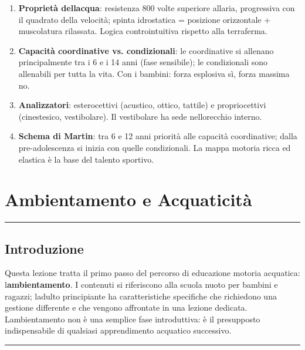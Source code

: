 \documentclass[a4paper,11pt]{article}
\begin{document}
\begin{enumerate}
      \item
            \textbf{Proprietà dell\textquotesingle acqua}: resistenza 800 volte
            superiore all\textquotesingle aria, progressiva con il quadrato della
            velocità; spinta idrostatica = posizione orizzontale + muscolatura
            rilassata. Logica controintuitiva rispetto alla terraferma.
      \item
            \textbf{Capacità coordinative vs. condizionali}: le coordinative si
            allenano principalmente tra i 6 e i 14 anni (fase sensibile); le
            condizionali sono allenabili per tutta la vita. Con i bambini: forza
            esplosiva sì, forza massima no.
      \item
            \textbf{Analizzatori}: esterocettivi (acustico, ottico, tattile) e
            propriocettivi (cinestesico, vestibolare). Il vestibolare ha sede
            nell\textquotesingle orecchio interno.
      \item
            \textbf{Schema di Martin}: tra 6 e 12 anni priorità alle capacità
            coordinative; dalla pre-adolescenza si inizia con quelle condizionali.
            La mappa motoria ricca ed elastica è la base del talento sportivo.
\end{enumerate}

\section{Ambientamento e
  Acquaticità}\label{ambientamento-e-acquaticituxe0}

\begin{center}\rule{0.5\linewidth}{0.5pt}\end{center}

\subsection{Introduzione}\label{introduzione-10}

Questa lezione tratta il primo passo del percorso di educazione motoria
acquatica: l\textquotesingle{}\textbf{ambientamento}. I contenuti si
riferiscono alla scuola nuoto per bambini e ragazzi;
l\textquotesingle adulto principiante ha caratteristiche specifiche che
richiedono una gestione differente e che vengono affrontate in una
lezione dedicata. L\textquotesingle ambientamento non è una semplice
fase introduttiva: è il presupposto indispensabile di qualsiasi
apprendimento acquatico successivo.

\begin{center}\rule{0.5\linewidth}{0.5pt}\end{center}
\end{document}
